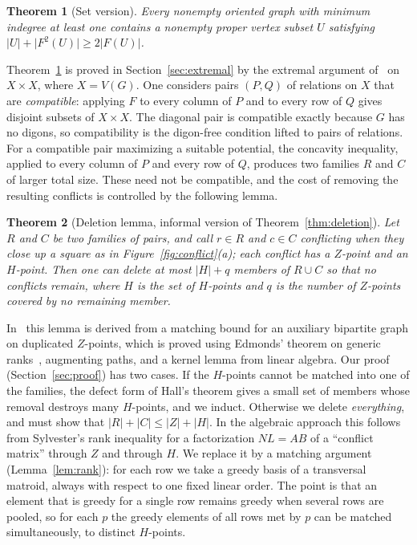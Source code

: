 \documentclass[11pt]{amsart}
\newtheorem{theorem}{Theorem}[section]
\theoremstyle{remark}
\newcommand{\abs}[1]{\lvert #1\rvert}
\begin{document}
\begin{theorem}[Set version]\label{thm:set}
Every nonempty oriented graph with minimum indegree at least one contains a nonempty proper vertex subset $U$ satisfying $\abs U+\abs{F^2(U)}\ge2\abs{F(U)}$.
\end{theorem}

Theorem~\ref{thm:set} is proved in Section~\ref{sec:extremal} by the extremal argument of~\cite{OAI} on $X\times X$, where $X=V(G)$. One considers pairs $(P,Q)$ of relations on $X$ that are \emph{compatible}: applying $F$ to every column of $P$ and to every row of $Q$ gives disjoint subsets of $X\times X$. The diagonal pair is compatible exactly because $G$ has no digons, so compatibility is the digon-free condition lifted to pairs of relations. For a compatible pair maximizing a suitable potential, the concavity inequality, applied to every column of $P$ and every row of $Q$, produces two families $R$ and $C$ of larger total size. These need not be compatible, and the cost of removing the resulting conflicts is controlled by the following lemma.

\begin{theorem}[Deletion lemma, informal version of Theorem~\ref{thm:deletion}]\label{thm:intro}
Let $R$ and $C$ be two families of pairs, and call $r\in R$ and $c\in C$ \emph{conflicting} when they close up a square as in Figure~\ref{fig:conflict}(a); each conflict has a $Z$-point and an $H$-point. Then one can delete at most $\abs H+q$ members of $R\cup C$ so that no conflicts remain, where $H$ is the set of $H$-points and $q$ is the number of $Z$-points covered by no remaining member.
\end{theorem}

In~\cite{OAI} this lemma is derived from a matching bound for an auxiliary bipartite graph on duplicated $Z$-points, which is proved using Edmonds' theorem on generic ranks~\cite{Edmonds}, augmenting paths, and a kernel lemma from linear algebra. Our proof (Section~\ref{sec:proof}) has two cases. If the $H$-points cannot be matched into one of the families, the defect form of Hall's theorem gives a small set of members whose removal destroys many $H$-points, and we induct. Otherwise we delete \emph{everything}, and must show that $\abs R+\abs C\le\abs Z+\abs H$. In the algebraic approach this follows from Sylvester's rank inequality for a factorization $NL=AB$ of a ``conflict matrix'' through $Z$ and through $H$. We replace it by a matching argument (Lemma~\ref{lem:rank}): for each row we take a greedy basis of a transversal matroid, always with respect to one fixed linear order. The point is that an element that is greedy for a single row remains greedy when several rows are pooled, so for each $p$ the greedy elements of all rows met by $p$ can be matched simultaneously, to distinct $H$-points.
\end{document}
